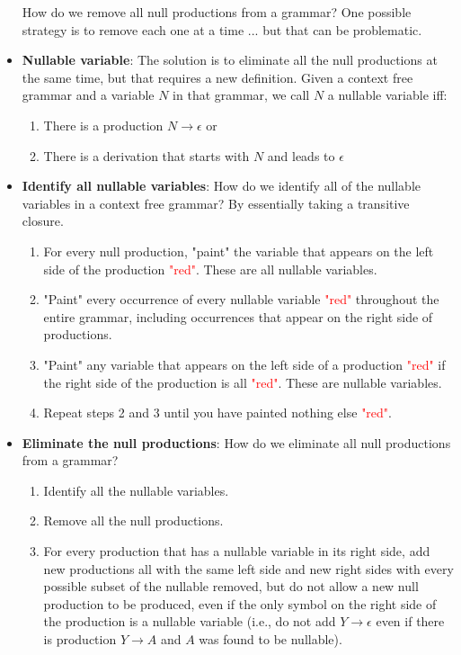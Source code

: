 \documentclass{report}
\begin{document}
\begin{itemize}
            \bigbreak \noindent 
            How do we remove all null productions from a grammar? One possible strategy is to remove each one at a time ... but that can be problematic. 
        \item \textbf{Nullable variable}: The solution is to eliminate all the null productions at the same time, but that requires a new definition.
            \bigbreak \noindent 
            Given a context free grammar and a variable $N$ in that grammar,
            we call $N$ a nullable variable iff:
            \begin{enumerate}
                \item There is a production $N\to \epsilon$ or
                \item There is a derivation that starts with $N$ and leads to $\epsilon$
            \end{enumerate}
        \item \textbf{Identify all nullable variables}: How do we identify all of the nullable variables in a context free grammar? By essentially taking a transitive closure.
            \begin{enumerate}
                \item For every null production, "paint" the variable that appears on the left side of the production \textcolor{red}{"red"}. These are all nullable variables.
                \item "Paint" every occurrence of every nullable variable \textcolor{red}{"red"} throughout the entire grammar, including occurrences that appear on the right side of productions.
                \item "Paint" any variable that appears on the left side of a production \textcolor{red}{"red"} if the right side of the production is all \textcolor{red}{"red"}. These are nullable variables.
                \item Repeat steps 2 and 3 until you have painted nothing else \textcolor{red}{"red"}.
            \end{enumerate}
        \item \textbf{Eliminate the null productions}: How do we eliminate all null productions from a grammar?
            \begin{enumerate}
                \item Identify all the nullable variables.
                \item Remove all the null productions.
                \item For every production that has a nullable variable in its right side, add new productions all with the same left side and new right sides with every possible subset of the nullable removed, but do not allow a new null production to be produced, even if the only symbol on the right side of the production is a nullable variable (i.e., do not add $Y\to \epsilon$ even if there is production $Y\to A$ and $A$ was found to be nullable).

\end{enumerate}
\end{itemize}
\end{document}

